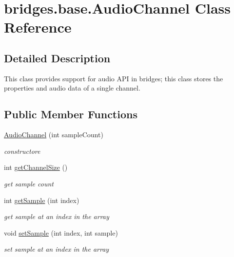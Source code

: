 \hypertarget{classbridges_1_1base_1_1_audio_channel}{}\section{bridges.\+base.\+Audio\+Channel Class Reference}
\label{classbridges_1_1base_1_1_audio_channel}


\subsection{Detailed Description}
This class provides support for audio A\+PI in bridges; this class stores the properties and audio data of a single channel. \subsection*{Public Member Functions}
\begin{DoxyCompactItemize}
\item 
\hyperlink{classbridges_1_1base_1_1_audio_channel_a1fb5be6b6ba3f393abedc7cd068e0c49}{Audio\+Channel} (int sample\+Count)
\begin{DoxyCompactList}\small\item\em constructore \end{DoxyCompactList}\item 
int \hyperlink{classbridges_1_1base_1_1_audio_channel_af367155c1e380bc7e934af74e74b0ef7}{get\+Channel\+Size} ()
\begin{DoxyCompactList}\small\item\em get sample count \end{DoxyCompactList}\item 
int \hyperlink{classbridges_1_1base_1_1_audio_channel_a62b3fdc6e9e03996f15216d5f7f2d3fb}{get\+Sample} (int index)
\begin{DoxyCompactList}\small\item\em get sample at an index in the array \end{DoxyCompactList}\item 
void \hyperlink{classbridges_1_1base_1_1_audio_channel_aea69a2dab1bb9cc8c930f476b8392fd9}{set\+Sample} (int index, int sample)
\begin{DoxyCompactList}\small\item\em set sample at an index in the array \end{DoxyCompactList}\end{DoxyCompactItemize}


